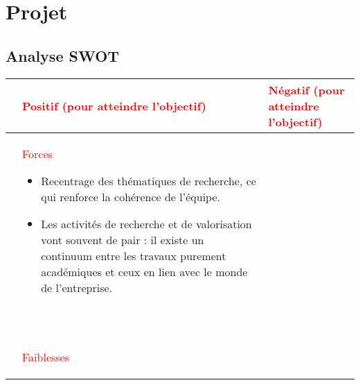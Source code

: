 \section{Projet}
	
	
\def\slp{\textsc{Nouveau Nom}}

	
		\subsection{Analyse SWOT}
		 
		 \renewcommand{\labelitemi}{$\bullet$}
		 

			\begin{table}[H]
			\begin{tabularx}{\textwidth}{|>{\centering\arraybackslash}l|>{\centering\arraybackslash}X|>{\centering\arraybackslash}X|}
			\hline
			&\textcolor{red}{Positif (pour atteindre l'objectif)} & \textcolor{red}{Négatif (pour atteindre l'objectif)}\\
			\hline
			\color{red}\parbox[t]{2mm}{} & \centering\textcolor{red}{Forces} 
			\smallskip
			\begin{itemize}
			\item  Recentrage des thématiques de recherche, ce qui renforce la cohérence de l'équipe.
			\item Les activités de recherche et de valorisation vont souvent de pair : il existe un continuum entre les travaux purement académiques et ceux en lien avec le monde de l'entreprise. 
			
			\end{itemize} ~\\ & \textcolor{red}{Faiblesses}
			\smallskip
			\begin{itemize}
			

\end{itemize}
\end{tabularx}
\end{table}
